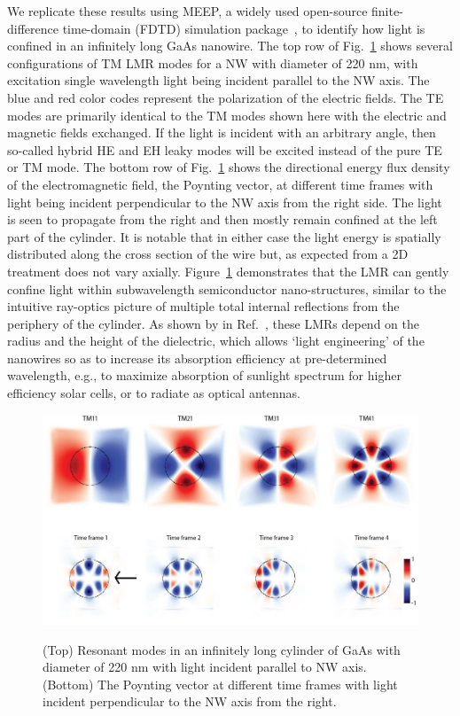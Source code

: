 We replicate these results using MEEP, a widely used open-source
finite-difference time-domain (FDTD) simulation package~\cite{Oskooi:2010fb},
to identify how light is confined in an infinitely long GaAs nanowire. The top
row of Fig.~\ref{CylindEz} shows several configurations of TM LMR modes for a
NW with diameter of 220 nm, with excitation single wavelength light being
incident parallel to the NW axis. The blue and red color codes represent the
polarization of the electric fields. The TE modes are primarily identical to
the TM modes shown here with the electric and magnetic fields exchanged. If the
light is incident with an arbitrary angle, then so-called hybrid HE and EH
leaky modes will be excited instead of the pure TE or TM mode. The bottom row
of Fig.~\ref{CylindEz} shows the directional energy flux density of the
electromagnetic field, the Poynting vector, at different time frames with light
being incident perpendicular to the NW axis from the right side. The light is
seen to propagate from the right and then mostly remain confined at the left
part of the cylinder. It is notable that in either case the light energy is
spatially distributed along the cross section of the wire but, as expected from
a 2D treatment does not vary axially. Figure~\ref{CylindEz} demonstrates that
the LMR can gently confine light within subwavelength semiconductor
nano-structures, similar to the intuitive ray-optics picture of multiple total
internal reflections from the periphery of the cylinder. As shown by in
Ref.~\cite{Cao:2009ho}, these LMRs depend on the radius and the height of the
dielectric, which allows ‘light engineering’ of the nanowires so as to increase
its absorption efficiency at pre-determined wavelength, e.g., to maximize
absorption of sunlight spectrum for higher efficiency solar cells, or to
radiate as optical antennas.

\begin{figure}
  \caption{(Top) Resonant modes in an infinitely long cylinder of GaAs with diameter of 220 nm with light incident parallel to NW axis. (Bottom) The Poynting vector at different time frames with light incident perpendicular to the NW axis from the right.}
  \centering
  \includegraphics[width=\textwidth]{pictures/LM/CylindEz}
  \label{CylindEz}
\end{figure}

